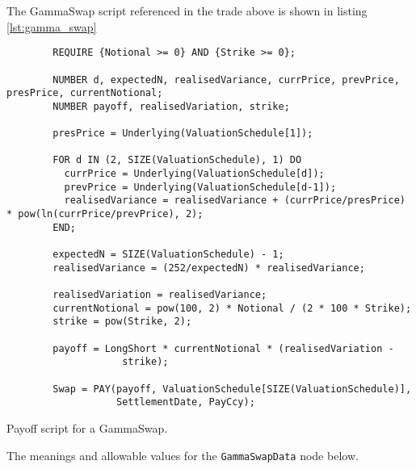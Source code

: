 The GammaSwap script referenced in the trade above is shown in listing
\ref{lst:gamma_swap}

\begin{listing}[hbt]
\begin{verbatim}
        REQUIRE {Notional >= 0} AND {Strike >= 0};

        NUMBER d, expectedN, realisedVariance, currPrice, prevPrice, presPrice, currentNotional;
        NUMBER payoff, realisedVariation, strike;

        presPrice = Underlying(ValuationSchedule[1]);

        FOR d IN (2, SIZE(ValuationSchedule), 1) DO
          currPrice = Underlying(ValuationSchedule[d]);
          prevPrice = Underlying(ValuationSchedule[d-1]);
          realisedVariance = realisedVariance + (currPrice/presPrice) * pow(ln(currPrice/prevPrice), 2);
        END;

        expectedN = SIZE(ValuationSchedule) - 1;
        realisedVariance = (252/expectedN) * realisedVariance;

        realisedVariation = realisedVariance;
        currentNotional = pow(100, 2) * Notional / (2 * 100 * Strike);
        strike = pow(Strike, 2);

        payoff = LongShort * currentNotional * (realisedVariation - 
                    strike);

        Swap = PAY(payoff, ValuationSchedule[SIZE(ValuationSchedule)],
                   SettlementDate, PayCcy);
\end{verbatim}
\caption{Payoff script for a GammaSwap.}
\label{lst:gamma_swap}
\end{listing}

The meanings and allowable values for the \lstinline!GammaSwapData! node below.

